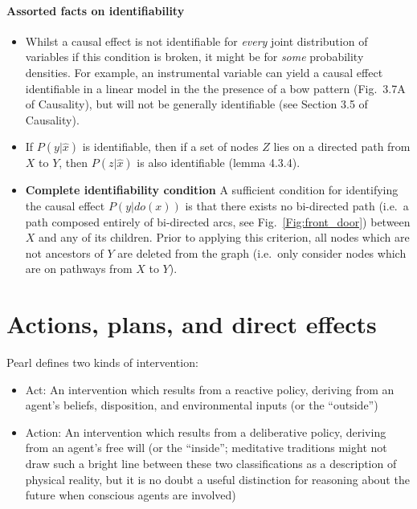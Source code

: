 \documentclass[11pt]{article}
\numberwithin{equation}{section}
\begin{document}
\paragraph{Assorted facts on identifiability} 

\begin{itemize}
\item Whilst a causal effect is not identifiable for \textit{every} joint distribution of variables if this condition is broken, it might be for \textit{some} probability densities. For example, an instrumental variable can yield a causal effect identifiable in a linear model in the the presence of a bow pattern (Fig.~3.7A of Causality), but will not be generally identifiable (see Section 3.5 of Causality).
\item If $P(y|\hat{x})$ is identifiable, then if a set of nodes $Z$ lies on a directed path from $X$ to $Y$, then $P(z|\hat{x})$ is also identifiable (lemma 4.3.4).
\item \textbf{Complete identifiability condition} A sufficient condition for identifying the causal effect $P(y|do(x))$ is that there exists no bi-directed path (i.e.\ a path composed entirely of bi-directed arcs, see Fig.~\ref{Fig:front_door}) between $X$ and any of its children. Prior to applying this criterion, all nodes which are not ancestors of $Y$ are deleted from the graph (i.e.\ only consider nodes which are on pathways from $X$ to $Y$).
\end{itemize}

\section{Actions, plans, and direct effects}

Pearl defines two kinds of intervention:

\begin{itemize}[noitemsep]
\item Act: An intervention which results from a reactive policy, deriving from an agent's beliefs, disposition, and environmental inputs (or the ``outside'')
\item Action: An intervention which results from a deliberative policy, deriving from an agent's free will (or the ``inside''; meditative traditions might not draw such a bright line between these two classifications as a  description of physical reality, but it is no doubt a useful distinction for reasoning about the future when conscious agents are involved)
\end{itemize} 
\end{document}
